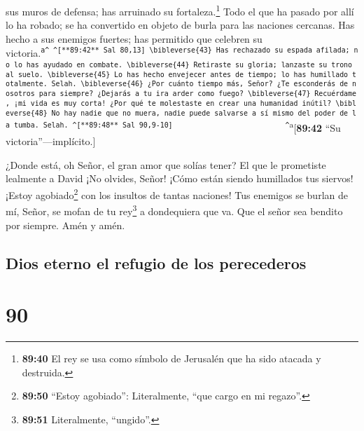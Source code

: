 sus muros de defensa; has arruinado su fortaleza.\footnote{\textbf{89:40}
  El rey se usa como símbolo de Jerusalén que ha sido atacada y
  destruida.}  Todo el que ha pasado por allí lo ha
robado; se ha convertido en objeto de burla para las naciones cercanas.
 Has hecho a sus enemigos fuertes; has permitido que
celebren su
victoria.\textsuperscript{\texttt{a\^{}\ \^{}{[}**89:42**\ Sal\ 80,13{]}\ \textbackslash{}bibleverse\{43\}\ Has\ rechazado\ su\ espada\ afilada;\ no\ lo\ has\ ayudado\ en\ combate.\ \textbackslash{}bibleverse\{44\}\ Retiraste\ su\ gloria;\ lanzaste\ su\ trono\ al\ suelo.\ \textbackslash{}bibleverse\{45\}\ Lo\ has\ hecho\ envejecer\ antes\ de\ tiempo;\ lo\ has\ humillado\ totalmente.\ Selah.\ \textbackslash{}bibleverse\{46\}\ ¿Por\ cuánto\ tiempo\ más,\ Señor?\ ¿Te\ esconderás\ de\ nosotros\ para\ siempre?\ ¿Dejarás\ a\ tu\ ira\ arder\ como\ fuego?\ \textbackslash{}bibleverse\{47\}\ Recuérdame,\ ¡mi\ vida\ es\ muy\ corta!\ ¿Por\ qué\ te\ molestaste\ en\ crear\ una\ humanidad\ inútil?\ \textbackslash{}bibleverse\{48\}\ No\ hay\ nadie\ que\ no\ muera,\ nadie\ puede\ salvarse\ a\ sí\ mismo\ del\ poder\ de\ la\ tumba.\ Selah.\ \^{}{[}**89:48**\ Sal\ 90,9-10{]}\ \ \ \ \ \ \ \ \ \ \ \ \ \ \ \ \ \ \ \ \ \ \ \ \ \ \ \^{}}a}{[}\textbf{89:42}
``Su victoria''---implícito.{]}

 ¿Donde está, oh Señor, el gran amor que solías tener? El
que le prometiste lealmente a David  ¡No olvides, Señor!
¡Cómo están siendo humillados tus siervos! ¡Estoy agobiado\footnote{\textbf{89:50}
  ``Estoy agobiado'': Literalmente, ``que cargo en mi regazo''.} con los
insultos de tantas naciones!  Tus enemigos se burlan de
mí, Señor, se mofan de tu rey\footnote{\textbf{89:51} Literalmente,
  ``ungido''.} a dondequiera que va.  Que el señor sea
bendito por siempre. Amén y amén.

\hypertarget{dios-eterno-el-refugio-de-los-perecederos}{%
\subsection{Dios eterno el refugio de los
perecederos}\label{dios-eterno-el-refugio-de-los-perecederos}}

\hypertarget{section-89}{%
\section{90}\label{section-89}}

